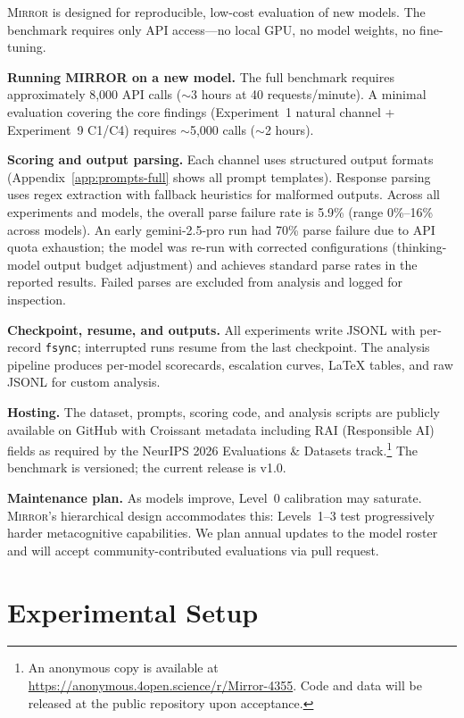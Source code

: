 \documentclass[10pt]{article}
\newcommand{\mirror}{\textsc{Mirror}}
\begin{document}
\mirror{} is designed for reproducible, low-cost evaluation of new models. The
benchmark requires only API access---no local GPU, no model weights, no fine-tuning.

\textbf{Running MIRROR on a new model.} The full benchmark requires approximately
8,000 API calls ($\sim$3 hours at 40 requests/minute). A minimal evaluation
covering the core findings (Experiment~1 natural channel + Experiment~9 C1/C4)
requires $\sim$5,000 calls ($\sim$2 hours).

\textbf{Scoring and output parsing.} Each channel uses structured output formats
(Appendix~\ref{app:prompts-full} shows all prompt templates). Response parsing uses
regex extraction with fallback heuristics for malformed outputs. Across all experiments and models, the overall parse failure rate is 5.9\%
(range 0\%--16\% across models). An early gemini-2.5-pro run had 70\% parse failure due to API quota exhaustion; the model was re-run with corrected configurations (thinking-model output budget adjustment) and achieves standard parse rates in the reported results. Failed parses are excluded from analysis and logged for inspection.

\textbf{Checkpoint, resume, and outputs.} All experiments write JSONL with
per-record \texttt{fsync}; interrupted runs resume from the last checkpoint.
The analysis pipeline produces per-model scorecards, escalation curves,
LaTeX tables, and raw JSONL for custom analysis.

\textbf{Hosting.} The dataset, prompts, scoring code, and analysis scripts are
publicly available on GitHub with Croissant metadata including RAI
(Responsible AI) fields as required by the NeurIPS 2026 Evaluations \& Datasets
track.\footnote{An anonymous copy is available at \url{https://anonymous.4open.science/r/Mirror-4355}. Code and data will be released at the public repository upon acceptance.} The benchmark is versioned;
the current release is v1.0.

\textbf{Maintenance plan.} As models improve, Level~0 calibration may saturate.
\mirror{}'s hierarchical design accommodates this: Levels~1--3 test progressively
harder metacognitive capabilities. We plan annual updates to the model roster and
will accept community-contributed evaluations via pull request.

\section{Experimental Setup}
\label{sec:setup}
\end{document}
